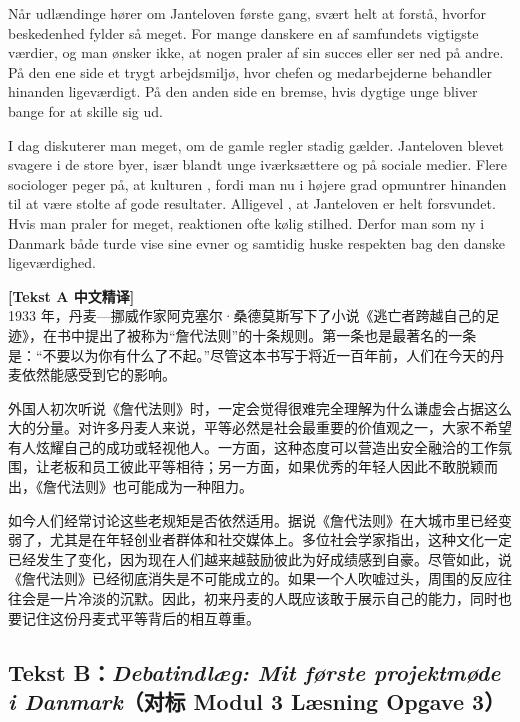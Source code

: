 Når udlændinge hører om Janteloven første gang,  svært helt at forstå, hvorfor beskedenhed fylder så meget. For mange danskere  en af samfundets vigtigste værdier, og man ønsker ikke, at nogen praler af sin succes eller ser ned på andre. På den ene side  et trygt arbejdsmiljø, hvor chefen og medarbejderne behandler hinanden ligeværdigt. På den anden side  en bremse, hvis dygtige unge bliver bange for at skille sig ud.

I dag diskuterer man meget, om de gamle regler stadig gælder. Janteloven  blevet svagere i de store byer, især blandt unge iværksættere og på sociale medier. Flere sociologer peger på, at kulturen , fordi man nu i højere grad opmuntrer hinanden til at være stolte af gode resultater. Alligevel , at Janteloven er helt forsvundet. Hvis man praler for meget,  reaktionen ofte  kølig stilhed. Derfor  man som ny i Danmark både turde vise sine evner og samtidig huske respekten bag den danske ligeværdighed.

\begin{transbox}
\small
\textbf{\color{NCDTeal}[Tekst A 中文精译]}\\
1933 年，丹麦—挪威作家阿克塞尔·桑德莫斯写下了小说《逃亡者跨越自己的足迹》，在书中提出了被称为“詹代法则”的十条规则。第一条也是最著名的一条是：“不要以为你有什么了不起。”尽管这本书写于将近一百年前，人们在今天的丹麦依然能感受到它的影响。

外国人初次听说《詹代法则》时，一定会觉得很难完全理解为什么谦虚会占据这么大的分量。对许多丹麦人来说，平等必然是社会最重要的价值观之一，大家不希望有人炫耀自己的成功或轻视他人。一方面，这种态度可以营造出安全融洽的工作氛围，让老板和员工彼此平等相待；另一方面，如果优秀的年轻人因此不敢脱颖而出，《詹代法则》也可能成为一种阻力。

如今人们经常讨论这些老规矩是否依然适用。据说《詹代法则》在大城市里已经变弱了，尤其是在年轻创业者群体和社交媒体上。多位社会学家指出，这种文化一定已经发生了变化，因为现在人们越来越鼓励彼此为好成绩感到自豪。尽管如此，说《詹代法则》已经彻底消失是不可能成立的。如果一个人吹嘘过头，周围的反应往往会是一片冷淡的沉默。因此，初来丹麦的人既应该敢于展示自己的能力，同时也要记住这份丹麦式平等背后的相互尊重。
\end{transbox}

\subsection*{Tekst B：\textit{Debatindlæg: Mit første projektmøde i Danmark}（对标 Modul 3 Læsning Opgave 3）}

